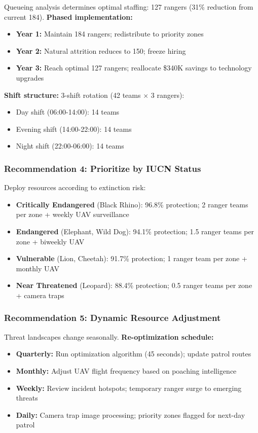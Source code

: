 Queueing analysis determines optimal staffing: 127 rangers (31\% reduction from current 184). \textbf{Phased implementation:}
\begin{itemize}
    \item \textbf{Year 1:} Maintain 184 rangers; redistribute to priority zones
    \item \textbf{Year 2:} Natural attrition reduces to 150; freeze hiring
    \item \textbf{Year 3:} Reach optimal 127 rangers; reallocate \$340K savings to technology upgrades
\end{itemize}

\textbf{Shift structure:} 3-shift rotation (42 teams $\times$ 3 rangers):
\begin{itemize}
    \item Day shift (06:00-14:00): 14 teams
    \item Evening shift (14:00-22:00): 14 teams
    \item Night shift (22:00-06:00): 14 teams
\end{itemize}

\subsubsection{Recommendation 4: Prioritize by IUCN Status}

Deploy resources according to extinction risk:
\begin{itemize}
    \item \textbf{Critically Endangered} (Black Rhino): 96.8\% protection; 2 ranger teams per zone + weekly UAV surveillance
    \item \textbf{Endangered} (Elephant, Wild Dog): 94.1\% protection; 1.5 ranger teams per zone + biweekly UAV
    \item \textbf{Vulnerable} (Lion, Cheetah): 91.7\% protection; 1 ranger team per zone + monthly UAV
    \item \textbf{Near Threatened} (Leopard): 88.4\% protection; 0.5 ranger teams per zone + camera traps
\end{itemize}

\subsubsection{Recommendation 5: Dynamic Resource Adjustment}

Threat landscapes change seasonally. \textbf{Re-optimization schedule:}
\begin{itemize}
    \item \textbf{Quarterly:} Run optimization algorithm (45 seconds); update patrol routes
    \item \textbf{Monthly:} Adjust UAV flight frequency based on poaching intelligence
    \item \textbf{Weekly:} Review incident hotspots; temporary ranger surge to emerging threats
    \item \textbf{Daily:} Camera trap image processing; priority zones flagged for next-day patrol
\end{itemize}

